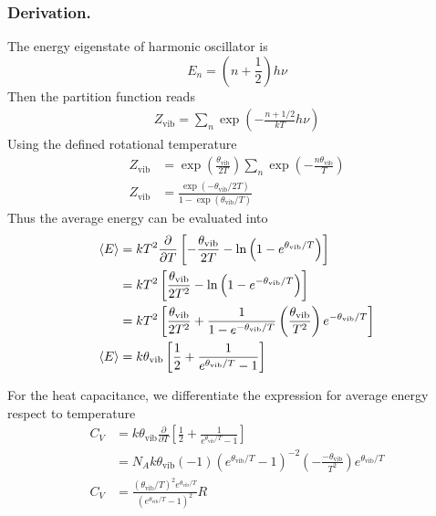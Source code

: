 \documentclass[../../../Main.tex]{subfiles}
\begin{document}
\subsubsection{Derivation.} The energy eigenstate of harmonic oscillator is
\begin{equation*}
	E_n=\left(n+\frac{1}{2}\right)h\nu
\end{equation*}
Then the partition function reads
\begin{align*}
	Z_\text{vib}=\sum_n \exp\left(-\frac{n+1/2}{kT}h\nu\right)
\end{align*}
Using the defined rotational temperature
\begin{align*}
	Z_\text{vib} & = \exp\left(\frac{\theta_\text{vib}}{2T}\right)\sum_n \exp\left(-\frac{n\theta_\text{vib}}{T}\right) \\
	Z_\text{vib} & =\frac{\exp(-\theta_\text{vib}/2T)}{1-\exp(\theta_\text{vib}/T)}
\end{align*}
Thus the average energy can be evaluated into
\begin{align*}
	\braket{E} & =kT^2\frac{\partial}{\partial T}\left[-\frac{\theta_\text{vib}}{2T}-\ln\left(1-e^{\theta_\text{vib}/T}\right)\right]                                     \\
	           & =kT^2\left[\frac{\theta_\text{vib}}{2T^2} -\ln\left(1-e^{-\theta_\text{vib}/T}\right)\right]                                                             \\
	           & =kT^2\left[\frac{\theta_\text{vib}}{2T^2} +\frac{1}{1-e^{-\theta_\text{vib}/T}}\left(\frac{\theta_\text{vib}}{T^2}\right)e^{-\theta_\text{vib}/T}\right] \\
	\braket{E} & =k\theta_\text{vib}\left[\frac{1}{2}+\frac{1}{e^{\theta_\text{vib}/T}-1}\right]
\end{align*}

For the heat capacitance, we differentiate the expression for average energy respect to temperature
\begin{align*}
	C_V & =k\theta_\text{vib}\frac{\partial}{\partial T}\left[\frac{1}{2}+\frac{1}{e^{\theta_\text{vib}/T}-1}\right]                     \\
	    & =N_Ak\theta_\text{vib} (-1)(e^{\theta_\text{vib}/T}-1)^{-2}\left(-\frac{-\theta_\text{vib}}{T^2}\right)e^{\theta_\text{vib}/T} \\
	C_V & =\frac{(\theta_\text{vib}/T)^2e^{\theta_\text{vib}/T}}{(e^{\theta_\text{vib}/T}-1)^2}R
\end{align*}
\end{document}
